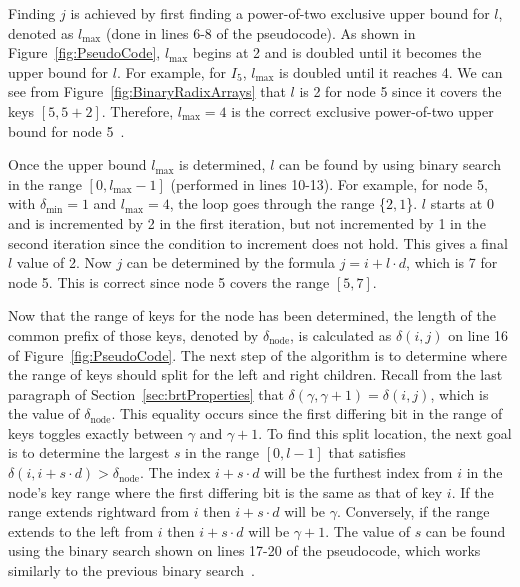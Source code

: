 \documentclass{sig-alternate}
\begin{document}
Finding $j$ is achieved by first finding a power-of-two exclusive upper bound for $l$, denoted as $l_{\textrm{max}}$ (done in lines 6-8 of the pseudocode). As shown in Figure~\ref{fig:PseudoCode}, $l_{\textrm{max}}$ begins at 2 and is doubled until it becomes the upper bound for $l$. For example, for $I_5$, $l_{\textrm{max}}$ is doubled until it reaches 4. We can see from Figure~\ref{fig:BinaryRadixArrays} that $l$ is 2 for node 5 since it covers the keys $[5,5+2]$. Therefore, $l_{\textrm{max}}=4$ is the correct exclusive power-of-two upper bound for node 5~\cite{Karras:2012}.

Once the upper bound $l_{\textrm{max}}$ is determined, $l$ can be found by using binary search in the range $[0,l_{\textrm{max}}-1]$ (performed in lines 10-13). For example, for node 5, with $\delta_{\textrm{min}}=1$ and $l_{\textrm{max}}=4$, the loop goes through the range \{$2, 1$\}. $l$ starts at 0 and is incremented by 2 in the first iteration, but not incremented by 1 in the second iteration since the condition to increment does not hold. This gives a final $l$ value of 2. Now $j$ can be determined by the formula $j=i+l \cdot d$, which is 7 for node 5. This is correct since node 5 covers the range $[5, 7]$.

Now that the range of keys for the node has been determined, the length of the common prefix of those keys, denoted by $\delta_{\textrm{node}}$, is calculated as $\delta(i,j)$ on line 16 of Figure~\ref{fig:PseudoCode}. The next step of the algorithm is to determine where the range of keys should split for the left and right children. Recall from the last paragraph of Section~\ref{sec:brtProperties} that $\delta(\gamma,\gamma+1)=\delta(i,j)$, which is the value of $\delta_{\textrm{node}}$. This equality occurs since the first differing bit in the range of keys toggles exactly between $\gamma$ and $\gamma+1$. To find this split location, the next goal is to determine the largest $s$ in the range $[0, l-1]$ that satisfies $\delta(i, i+s \cdot d) > \delta_{\textrm{node}}$. The index $i+s \cdot d$ will be the furthest index from $i$ in the node's key range where the first differing bit is the same as that of key $i$. If the range extends rightward from $i$ then $i+s \cdot d$ will be $\gamma$. Conversely, if the range extends to the left from $i$ then $i+s \cdot d$ will be $\gamma+1$. The value of $s$ can be found using the binary search shown on lines 17-20 of the pseudocode, which works similarly to the previous binary search~\cite{Karras:2012}.


\end{document}
